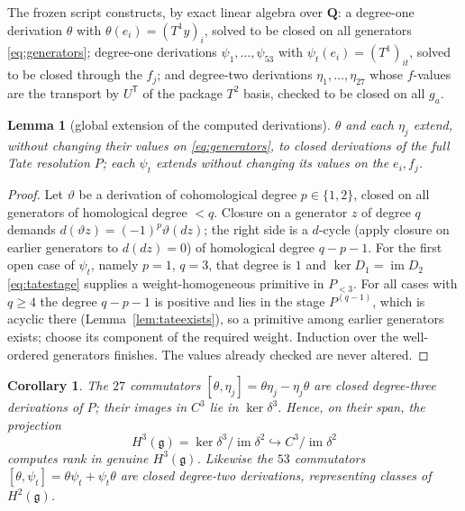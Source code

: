 \documentclass[11pt]{article}
\newtheorem{lemma}[theorem]{Lemma}
\newtheorem{corollary}[theorem]{Corollary}
\theoremstyle{definition}
\theoremstyle{remark}
\newcommand{\QQ}{\mathbf Q}
\newcommand{\im}{\operatorname{im}}
\newcommand{\g}{\mathfrak g}
\begin{document}
The frozen script 
constructs, by exact linear algebra over $\QQ$:
a degree-one derivation $\theta$ with $\theta(e_i)=(T^1y)_i$, solved to be
closed on all generators \eqref{eq:generators}; degree-one derivations
$\psi_1,\ldots,\psi_{53}$ with $\psi_t(e_i)=(T^1)_{it}$, solved to be
closed through the $f_j$; and degree-two derivations
$\eta_1,\ldots,\eta_{27}$ whose $f$-values are the transport by
$U^{\mathsf T}$ of the package $T^2$ basis, checked to be closed on all
$g_a$.

\begin{lemma}[global extension of the computed derivations]
\label{lem:derextend}
$\theta$ and each $\eta_j$ extend, without changing their values on
\eqref{eq:generators}, to closed derivations of the full Tate resolution
$P$; each $\psi_t$ extends without changing its values on the $e_i,f_j$.
\end{lemma}

\begin{proof}
Let $\vartheta$ be a derivation of cohomological degree $p\in\{1,2\}$,
closed on all generators of homological degree $<q$.  Closure on a
generator $z$ of degree $q$ demands
$d(\vartheta z)=(-1)^p\vartheta(dz)$; the right side is a $d$-cycle (apply
closure on earlier generators to $d(dz)=0$) of homological degree
$q-p-1$.  For the first open case of $\psi_t$, namely $p=1$, $q=3$, that
degree is $1$ and $\ker D_1=\im D_2$ \eqref{eq:tatestage} supplies a
weight-homogeneous primitive in $P_{<3}$.  For all cases with $q\geq4$ the
degree $q-p-1$ is positive and lies in the stage $P^{(q-1)}$, which is
acyclic there (Lemma~\ref{lem:tateexists}), so a primitive among earlier
generators exists; choose its component of the required weight.  Induction
over the well-ordered generators finishes.  The values already checked are
never altered.
\end{proof}

\begin{corollary}\label{cor:h3}
The $27$ commutators $[\theta,\eta_j]=\theta\eta_j-\eta_j\theta$ are closed
degree-three derivations of $P$; their images in $C^3$ lie in
$\ker\delta^3$.  Hence, on their span, the projection
\[
 H^3(\g)=\ker\delta^3/\im\delta^2
 \hookrightarrow C^3/\im\delta^2
\tag{5.1}\label{eq:h3inject}
\]
computes rank in genuine $H^3(\g)$.  Likewise the $53$ commutators
$[\theta,\psi_t]=\theta\psi_t+\psi_t\theta$ are closed degree-two
derivations, representing classes of $H^2(\g)$.
\end{corollary}
\end{document}
